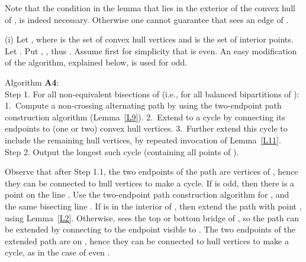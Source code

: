 \documentclass[proceedings]{stacs}
\begin{document}
\smallskip
Note that the condition in the lemma that  lies in the exterior of
the convex hull of , is indeed necessary. Otherwise one cannot
guarantee that  sees an edge of .


\smallskip
{\rm (i)} Let , where  is the set of convex hull
vertices and  is the set of interior points.
Let .
Put , , thus . Assume first for simplicity that
 is even. An easy modification of the algorithm, explained below, is used
for  odd.

\smallskip
\noindent Algorithm {\bf A4}: \\
{\sc Step 1.} For all non-equivalent
bisections of   (i.e., for all balanced bipartitions of ):
1.~Compute a non-crossing alternating path  by using the two-endpoint path
construction algorithm (Lemma~\ref{L9}).
2.~Extend  to a cycle by connecting its endpoints to (one or two)
convex hull vertices. 3.~Further extend this cycle to include the
remaining hull vertices, by repeated invocation of Lemma~\ref{L11}. \\
{\sc Step 2.} Output the longest such cycle (containing all points of ).

\smallskip
Observe that after {\sc Step 1.}1, the two endpoints of the path are vertices
of , hence they can be connected to hull vertices to make a cycle.
If  is odd, then there is a point  on the line .
Use the two-endpoint path construction algorithm for , and
the same bisecting line . If  is in the interior of
, then extend the path with point , using
Lemma~\ref{L2}. Otherwise,  sees the top or bottom bridge of
, so the path can be extended by connecting 
to the endpoint visible to . The two endpoints of the extended path are on
, hence they can be connected to hull vertices to make a
cycle, as in the case of even .
\end{document}
